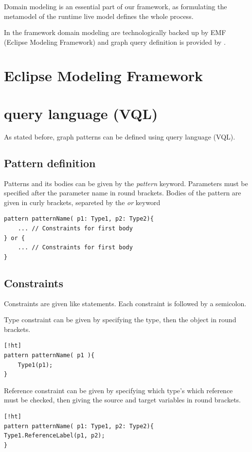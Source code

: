Domain modeling is an essential part of our framework, as formulating the metamodel of the runtime live model defines the whole process.

In the framework domain modeling are technologically backed up by EMF (Eclipse Modeling Framework) and graph query definition is provided by \viatra{}.

\section{Eclipse Modeling Framework}


	

\section{\viatra{} query language (VQL)}

As stated before, graph patterns can be defined using \viatra{} query language (VQL). 

\subsection{Pattern definition}
Patterns and its bodies can be given by the \emph{pattern} keyword. 
Parameters must be specified after the parameter name in round brackets. 
Bodies of the pattern are given in curly brackets, separeted by the \emph{or} keyword
\begin{lstlisting}[language = vql]
pattern patternName( p1: Type1, p2: Type2){
	... // Constraints for first body
} or {
	... // Constraints for first body
}
\end{lstlisting}


\subsection{Constraints}
Constraints are given like statements. 
Each constraint is followed by a semicolon.

Type constraint can be given by specifying the type, then the object in round brackets.
\begin{lstlisting}[language = vql][!ht]
pattern patternName( p1 ){
	Type1(p1);
}
\end{lstlisting}

Reference constraint can be given by specifying which type's which reference must be checked, then giving the source and target variables in round brackets.
\begin{lstlisting}[language = vql][!ht]
pattern patternName( p1: Type1, p2: Type2){
Type1.ReferenceLabel(p1, p2);
}
\end{lstlisting}

